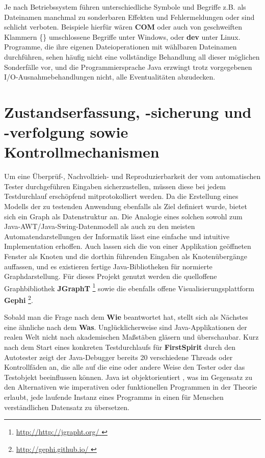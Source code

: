 Je nach Betriebssystem führen unterschiedliche Symbole und Begriffe z.B. als Datei\-namen
manchmal zu sonderbaren Effekten und Fehlermeldungen oder sind schlicht verboten.
Beispiele hierfür wären \textbf{COM} oder auch von geschweiften Klammern \glqq{}\{\}\grqq{} umschlossene
Begriffe unter Windows, oder \textbf{dev} unter Linux. Programme, die ihre eigenen
Dateioperationen mit wählbaren Dateinamen durchführen, sehen häufig nicht eine vollständige
Behandlung all dieser möglichen Sonderfälle vor, und die Programmiersprache Java erzwingt
trotz vorgegebenen I/O-Ausnahme\-behandlungen nicht, alle Eventualitäten abzudecken.


\section{Zustandserfassung, -sicherung und -verfolgung sowie Kontrollmechanismen}\label{section:statemonitoring}

Um eine Überprüf-, Nachvollzieh- und Reproduzierbarkeit der vom automatischen Tester
durchgeführen Eingaben sicherzustellen, müssen diese bei jedem Testdurchlauf erschöpfend
mitprotokolliert werden. Da die Erstellung eines Modells der zu testenden Anwendung 
ebenfalls als Ziel definiert wurde, bietet sich ein Graph als Datenstruktur an. Die Analogie
eines solchen sowohl zum Java-AWT/Java-Swing-Datenmodell als auch zu den meisten 
Automatendarstellungen der Informatik lässt eine einfache und intuitive Implementation
erhoffen. Auch lassen sich die von einer Applikation geöffneten Fenster als Knoten und die
dorthin führenden Eingaben als Knotenübergänge auffassen, und es existieren
fertige Java-Bibliotheken für normierte Graphdarstellung. Für dieses Projekt genutzt
werden die quelloffene Graphbibliothek \textbf{JGraphT} \footnote{\url{ http://http://jgrapht.org/ }} sowie die
ebenfalls offene Visualisierungsplattform \textbf{Gephi} \footnote{\url{ http://gephi.github.io/ }}.

Sobald man die Frage nach dem \textbf{Wie} beantwortet hat, stellt sich als Nächstes
eine ähnliche nach dem \textbf{Was}. Unglücklicherweise sind Java-Applikationen der realen
Welt nicht nach akademischen Maßstäben gläsern und überschaubar. Kurz nach dem
Start eines konkreten Testdurchlaufs für \textbf{FirstSpirit} durch den Autotester zeigt der
Java-Debugger bereits 20 verschiedene Threads oder Kontrollfäden an, die alle auf
die eine oder andere Weise den Tester oder das Testobjekt beeinflussen können.
Java ist objektorientiert \cite{java7insel}, was im Gegensatz zu den Alternativen 
wie imperativen oder funktionellen Programmen in der Theorie erlaubt, jede laufende 
Instanz eines Programms in einen für Menschen verständlichen Datensatz zu übersetzen.

